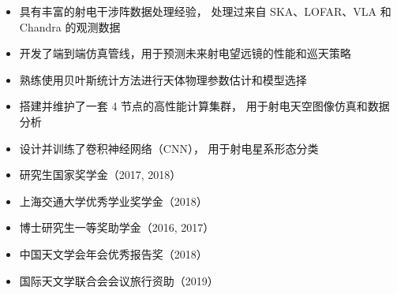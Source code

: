 \documentclass[zh]{resume}
\begin{document}
\begin{competences}
\end{competences}

\begin{itemize}
  \item 具有丰富的射电干涉阵数据处理经验，
    处理过来自 SKA、LOFAR、VLA 和 Chandra 的观测数据
  \item 开发了端到端仿真管线，用于预测未来射电望远镜的性能和巡天策略
  \item 熟练使用贝叶斯统计方法进行天体物理参数估计和模型选择
  \item 搭建并维护了一套 4 节点的高性能计算集群，
    用于射电天空图像仿真和数据分析
  \item 设计并训练了卷积神经网络（CNN），
    用于射电星系形态分类
\end{itemize}

\begin{itemize}
  \item 研究生国家奖学金（2017, 2018）
  \item 上海交通大学优秀学业奖学金（2018）
  \item 博士研究生一等奖助学金（2016, 2017）
  \item 中国天文学会年会优秀报告奖（2018）
  \item 国际天文学联合会会议旅行资助（2019）
\end{itemize}
\end{document}
